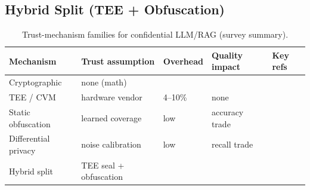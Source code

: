 \subsection{Hybrid Split (TEE + Obfuscation)}

\begin{table}[t]
  \centering
  \caption{Trust-mechanism families for confidential LLM/RAG (survey summary).}
  \label{tab:mechanisms}
  \begin{tabular}{@{}lllll@{}}
    \toprule
    Mechanism            & Trust assumption        & Overhead         & Quality impact   & Key refs \\
    \midrule
    Cryptographic        & none (math)             & \needswork{}     & \needswork{}     & \needswork{} \\
    TEE / CVM            & hardware vendor         & 4--10\%          & none             & \cite{xue_twinshield} \\
    Static obfuscation   & learned coverage        & low              & accuracy trade   & \cite{lin_aloepri,belikov_gelo} \\
    Differential privacy & noise calibration       & low              & recall trade     & \cite{cheng2025remoterag} \\
    Hybrid split         & TEE seal + obfuscation  & \needswork{}     & \needswork{}     & \cite{belikov_gelo} \\
    \bottomrule
  \end{tabular}
\end{table}
